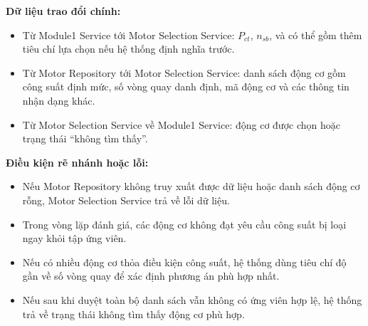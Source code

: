 \documentclass[a4paper]{article}
\begin{document}
\textbf{Dữ liệu trao đổi chính:}
\begin{itemize}
\item Từ Module1 Service tới Motor Selection Service: \(P_{ct}\), \(n_{sb}\), và có thể gồm thêm tiêu chí lựa chọn nếu hệ thống định nghĩa trước.
\item Từ Motor Repository tới Motor Selection Service: danh sách động cơ gồm công suất định mức, số vòng quay danh định, mã động cơ và các thông tin nhận dạng khác.
\item Từ Motor Selection Service về Module1 Service: động cơ được chọn hoặc trạng thái ``không tìm thấy''.
\end{itemize}

\textbf{Điều kiện rẽ nhánh hoặc lỗi:}
\begin{itemize}
\item Nếu Motor Repository không truy xuất được dữ liệu hoặc danh sách động cơ rỗng, Motor Selection Service trả về lỗi dữ liệu.
\item Trong vòng lặp đánh giá, các động cơ không đạt yêu cầu công suất bị loại ngay khỏi tập ứng viên.
\item Nếu có nhiều động cơ thỏa điều kiện công suất, hệ thống dùng tiêu chí độ gần về số vòng quay để xác định phương án phù hợp nhất.
\item Nếu sau khi duyệt toàn bộ danh sách vẫn không có ứng viên hợp lệ, hệ thống trả về trạng thái không tìm thấy động cơ phù hợp.
\end{itemize}
\end{document}
